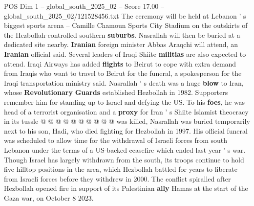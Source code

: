 \begin{textsample}{POS Dim 1 – global\_south\_2025\_02 – Score 17.00 – global\_south\_2025\_02/121528456.txt}
The ceremony will be held at Lebanon ' s biggest sports arena -- Camille Chamoun Sports City Stadium on the outskirts of the Hezbollah-controlled southern \textbf{suburbs}.
Nasrallah will then be buried at a dedicated site nearby. \textbf{Iranian} foreign minister Abbas Araqchi will attend, an \textbf{Iranian} official said.
Several leaders of Iraqi Shiite \textbf{militias} are also expected to attend.
Iraqi Airways has added \textbf{flights} to Beirut to cope with extra demand from Iraqis who want to travel to Beirut for the funeral, a spokesperson for the Iraqi transportation ministry said.
Nasrallah ' s death was a huge \textbf{blow} to Iran, whose \textbf{Revolutionary} \textbf{Guards} established Hezbollah in 1982.
Supporters remember him for standing up to Israel and defying the US.
To his \textbf{foes}, he was head of a terrorist organisation and a \textbf{proxy} for Iran ' s Shiite Islamist theocracy in its tussle @ @ @ @ @ @ @ @ @ @ was killed, Nasrallah was buried temporarily next to his son, Hadi, who died fighting for Hezbollah in 1997.
His official funeral was scheduled to allow time for the withdrawal of Israeli forces from south Lebanon under the terms of a US-backed ceasefire which ended last year ' s war.
Though Israel has largely withdrawn from the south, its troops continue to hold five hilltop positions in the area, which Hezbollah battled for years to liberate from Israeli forces before they withdrew in 2000.
The conflict spiralled after Hezbollah opened fire in support of its Palestinian \textbf{ally} Hamas at the start of the Gaza war, on October 8 2023.

\end{textsample}
